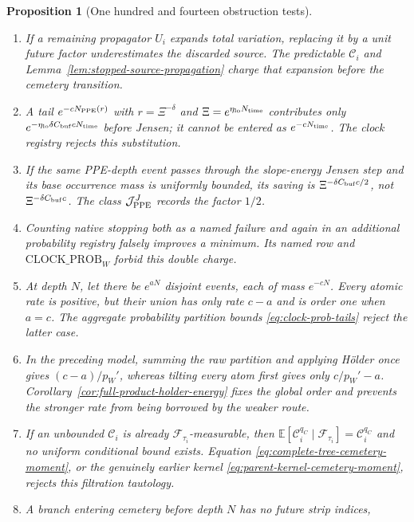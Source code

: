 \documentclass[11pt]{article}
\newtheorem{proposition}[theorem]{Proposition}
\begin{document}
\begin{proposition}[One hundred and fourteen obstruction tests]
\begin{enumerate}[label=\textup{(T\arabic*)}]
      mass $e^{-qN}$.  Its probability tail has rate $q$, but its current
      has only rate $q-a$.  Equation \eqref{eq:cemetery-kernel-domination}
      rejects the missing envelope.
\item If a remaining propagator $U_i$ expands total variation, replacing it
      by a unit future factor underestimates the discarded source.  The
      predictable $\mathcal C_i$ and
      Lemma~\ref{lem:stopped-source-propagation} charge that expansion before
      the cemetery transition.
\item A tail $e^{-cN_{\rm PPE}(r)}$ with $r=\Xi^{-\delta}$ and
      $\Xi=e^{\eta_{\rm lo}N_{\rm time}}$ contributes only
      $e^{-\eta_{\rm lo}\delta C_{\rm buf}cN_{\rm time}}$ before Jensen; it
      cannot be entered as $e^{-cN_{\rm time}}$.  The clock registry rejects
      this substitution.
\item If the same PPE-depth event passes through the slope-energy Jensen
      step and its base occurrence mass is uniformly bounded, its saving is
      $\Xi^{-\delta C_{\rm buf}c/2}$, not
      $\Xi^{-\delta C_{\rm buf}c}$.  The class
      $\mathcal J_{\rm PPE}^{J}$ records the factor $1/2$.
\item Counting native stopping both as a named failure and again in an
      additional probability registry falsely improves a minimum.  Its
      named row and \(\mathrm{CLOCK\_PROB}_{W}\) forbid this double charge.
\item At depth $N$, let there be $e^{aN}$ disjoint events, each of mass
      $e^{-cN}$.  Every atomic rate is positive, but their union has only
      rate $c-a$ and is order one when $a=c$.  The aggregate probability
      partition bounds \eqref{eq:clock-prob-tails} reject the latter case.
\item In the preceding model, summing the raw partition and applying
      H\"older once gives $(c-a)/p_W'$, whereas tilting every atom first gives
      only $c/p_W'-a$.  Corollary~\ref{cor:full-product-holder-energy}
      fixes the global order and prevents the stronger rate from being
      borrowed by the weaker route.
\item If an unbounded $\mathcal C_i$ is already
      $\mathcal F_{\tau_i}$-measurable, then
      $\mathbb E[\mathcal C_i^{q_C}\mid\mathcal F_{\tau_i}]
      =\mathcal C_i^{q_C}$ and no uniform conditional bound exists.
      Equation \eqref{eq:complete-tree-cemetery-moment}, or the genuinely
      earlier kernel \eqref{eq:parent-kernel-cemetery-moment}, rejects this
      filtration tautology.
\item A branch entering cemetery before depth $N$ has no future strip indices,

\end{enumerate}
\end{proposition}
\end{document}
